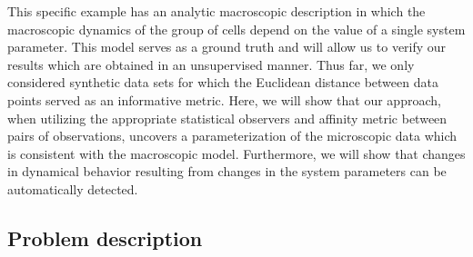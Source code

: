 \documentclass[preprint]{elsarticle}
\begin{document}
This specific example has an analytic macroscopic description in which the macroscopic dynamics of the group of cells depend on the value of a single system parameter.
%
This model serves as a ground truth and will allow us to verify our results which are obtained in an unsupervised manner.
%
Thus far, we only considered synthetic data sets for which the Euclidean distance between data points served as an informative metric. 
%
Here, we will show that our approach, when utilizing the appropriate statistical observers and affinity metric between pairs of observations, uncovers a parameterization of the microscopic data which is consistent with the macroscopic model.
%
Furthermore, we will show that changes in dynamical behavior resulting from changes in the system parameters can be automatically detected. 

%




\subsection{Problem description}
\end{document}
